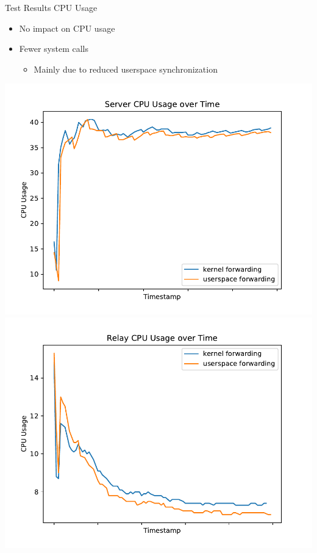 \documentclass[shortpres,aspectratio=43]{beamer}
\newlength{\mylength}
\begin{document}
\begin{frame}{Test Results CPU Usage}
    \begin{minipage}{0.4\textwidth}
        \begin{itemize}
            \item No impact on CPU usage
            \vspace{2\mylength}
            \item Fewer system calls
            \vspace{2\mylength}
            \begin{itemize}
                \item Mainly due to reduced userspace synchronization
            \end{itemize}
        \end{itemize}
    \end{minipage}\hfill
    \begin{minipage}{0.58\textwidth}
        \includegraphics[scale=0.21]{../figures/04_testing_and_results/cpu_usage_server_ns.pdf}
        \includegraphics[scale=0.21]{../figures/04_testing_and_results/cpu_usage_relay_ns.pdf}

\end{minipage}
\end{frame}
\end{document}
